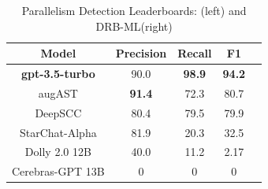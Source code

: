 \begin{table}[htbp]
  \centering
  \caption{Parallelism Detection Leaderboards: \crawldata(left) and DRB-ML(right)}
\label{tab:t2}
  \begin{minipage}{.5\linewidth}
    \centering
  \end{minipage}%
  \hspace{-1.13cm}
  \hspace{0.9cm}
   \begin{minipage}{.5\linewidth}
    \centering
    \resizebox{6cm}{!}
{
\begin{tabular}{|c|c|c|c|c|}
\hline
\textbf{Model} & \textbf{Precision}              & \textbf{Recall}                 & \textbf{F1}                     \\ \hline
\textbf{gpt-3.5-turbo}     & 90.0                   & \textbf{98.9}                  & \textbf{94.2}                   \\ \hline
augAST        & \textbf{91.4}                   & 72.3                   & 80.7                   \\ \hline
DeepSCC   & 80.4                   & 79.5                   & 79.9                   \\ \hline
StarChat-Alpha   & 81.9                   & 20.3                  & 32.5                   \\ \hline
Dolly 2.0 12B      & 40.0                   & 11.2                   & 2.17                      \\ \hline
Cerebras-GPT 13B    & 0                      & 0                      & 0
    \\ \hline
\end{tabular}
}
  \end{minipage}%
\end{table}



